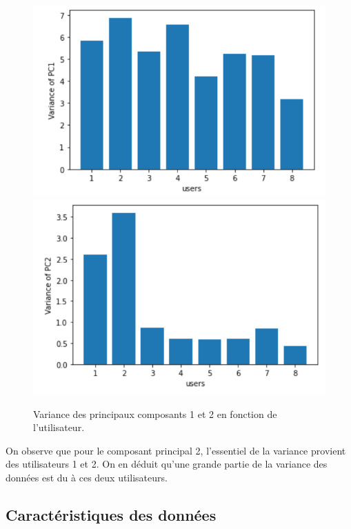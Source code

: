 \documentclass[12pt,a4paper,roman]{article}
\begin{document}
\begin{figure}[!h]
 	\begin{center}
 	\includegraphics[scale=0.35]{pc1.png}
 	\includegraphics[scale=0.35]{pc2.png}
 	\caption{Variance des principaux composants 1 et 2 en fonction de l'utilisateur.}
 	\end{center}
\end{figure}
On observe que pour le composant principal 2, l'essentiel de la variance provient des utilisateurs 1 et 2. On en déduit qu'une grande partie de la variance des données est du à ces deux utilisateurs.


\subsection{Caractéristiques des données}
\end{document}
